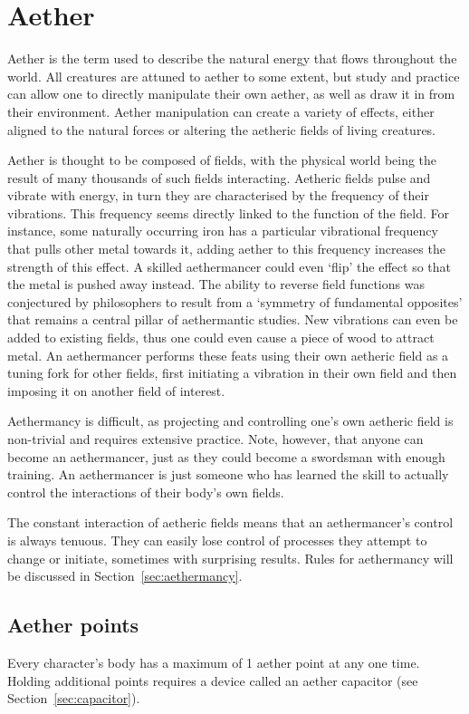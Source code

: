 \documentclass[a4paper,11pt,oneside]{book}
\newcommand{\textlf}[1]{\textbf{\titlecap{#1}}}
\begin{document}
  



\chapter{Aether}
Aether is the term used to describe the natural energy that flows throughout the world. All creatures are attuned to aether to some extent, but study and practice can allow one to directly manipulate their own aether, as well as draw it in from their environment. Aether manipulation can create a variety of effects, either aligned to the natural forces or altering the aetheric fields of living creatures.

Aether is thought to be composed of fields, with the physical world being the result of many thousands of such fields interacting. Aetheric fields pulse and vibrate with energy, in turn they are characterised by the frequency of their vibrations. This frequency seems directly linked to the function of the field. For instance, some naturally occurring iron has a particular vibrational frequency that pulls other metal towards it, adding aether to this frequency increases the strength of this effect. A skilled aethermancer could even `flip' the effect so that the metal is pushed away instead. The ability to reverse field functions was conjectured by philosophers to result from a `symmetry of fundamental opposites' that remains a central pillar of aethermantic studies. New vibrations can even be added to existing fields, thus one could even cause a piece of wood to attract metal. An aethermancer performs these feats using their own aetheric field as a tuning fork for other fields, first initiating a vibration in their own field and then imposing it on another field of interest.

Aethermancy is difficult, as projecting and controlling one's own aetheric field is non-trivial and requires extensive practice. Note, however, that anyone can become an aethermancer, just as they could become a swordsman with enough training. An aethermancer is just someone who has learned the skill to actually control the interactions of their body's own fields. 

The constant interaction of aetheric fields means that an aethermancer's control is always tenuous. They can easily lose control of processes they attempt to change or initiate, sometimes with surprising results. Rules for aethermancy will be discussed in Section~\ref{sec:aethermancy}.

\section{Aether points}
Every character's body has a maximum of 1 aether point at any one time. Holding additional points requires a device called an aether capacitor (see Section~\ref{sec:capacitor}). %
\end{document}
